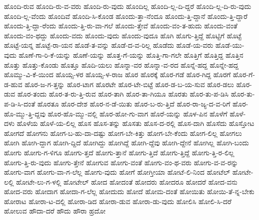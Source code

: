 {ಹೊಂದಿ-ರುವ
ಹೊಂದಿ-ರು-ವ-ವರು
ಹೊಂದಿ-ರು-ವುದು
ಹೊಂದಿಲ್ಲ
ಹೊಂದಿ-ಲ್ಲ-ದಿ-ದ್ದರೆ
ಹೊಂದಿ-ಲ್ಲ-ದಿ-ರು-ವುದು
ಹೊಂದಿ-ಲ್ಲ-ವೆಂದು
ಹೊಂದಿವೆ
ಹೊಂದಿ-ಸಿ-ಕೊಂಡ
ಹೊಂದು-ತ್ತಾ-ನೆಂದೂ
ಹೊಂದು-ತ್ತಿ-ದ್ದಾನೆ
ಹೊಂದು-ತ್ತಿ-ದ್ದಾರೆ
ಹೊಂದು-ತ್ತಿ-ದ್ದಾ-ರೆಂದು
ಹೊಂದು-ತ್ತಿ-ರು-ವಾ-ಗಲೆ
ಹೊಂದು-ತ್ತೇವೆ
ಹೊಂದು-ವಂ-ತ-ಹುದು
ಹೊಂದು-ವಂತೆ
ಹೊಂದು-ವಂ-ಥದ್ದು
ಹೊಂದು-ವದು
ಹೊಂದು-ವುದು
ಹೊಂದು-ವುದೂ
ಹೊಗಿ
ಹೊಗು-ತ್ತಿದ್ದೆ
ಹೊಟ್ಟಿಗೆ
ಹೊಟ್ಟೆ
ಹೊಟ್ಟೆ-ಯನ್ನ
ಹೊಟ್ಟೆ-ರಾ-ಯನ
ಹೊಡೆ-ತ-ವನ್ನು
ಹೊಡೆ-ದ-ವ-ರಿಲ್ಲ
ಹೊಡೆದು
ಹೊಡೆ-ಯ-ವರು
ಹೊಡೆ-ಯು-ವುದು
ಹೊಣೆ-ಗಾ-ರಿ-ಕೆ-ಯನ್ನು
ಹೊಣೆ-ಯನ್ನು
ಹೊತ್ತ-ಗೆ-ಯನ್ನು
ಹೊತ್ತಿ-ಗಾ-ಗಲೇ
ಹೊತ್ತಿಗೆ
ಹೊತ್ತಿದ್ದ
ಹೊತ್ತಿನ
ಹೊತ್ತು
ಹೊತ್ತು-ಕೊಂಡು
ಹೊತ್ತೂ
ಹೊದಿ-ಯಲು
ಹೊನ್ನಾ-ವರ
ಹೊನ್ನಾ-ವ-ರದ
ಹೊನ್ನೆ-ಹದ್ದ
ಹೊನ್ನೇ-ಹದ್ದ
ಹೊಮ್ಮು-ವಿ-ಕೆ-ಯಿಂದ
ಹೊಯ್ಸ-ಳರ
ಹೊಯ್ಸ-ಳ-ರಾಜ
ಹೊರ
ಹೊರಕ್ಕೆ
ಹೊರ-ಗಡೆ
ಹೊರ-ಗಿದ್ದ
ಹೊರಗೆ
ಹೊರ-ಗೆ-ಡ-ಹುವ
ಹೊರ-ಜ-ಗ-ತ್ತನ್ನು
ಹೊರ-ಟಾಗ
ಹೊರಟೇ
ಹೊರ-ಟೇ-ಬಿಟ್ಟೆ
ಹೊರ-ಡ-ಬ-ಯ-ಸುವ
ಹೊರ-ಡಲು
ಹೊರ-ಡುವ
ಹೊರ-ತಂದು
ಹೊರ-ತ-ರು-ತ್ತಿ-ರುವ
ಹೊರ-ತಾಗಿ
ಹೊರ-ತಾ-ಗಿಯೂ
ಹೊರತು
ಹೊರ-ತು-ಪ-ಡಿಸಿ
ಹೊರ-ತು-ಪ-ಡಿ-ಸಿ-ದಂತೆ
ಹೊರತೂ
ಹೊರ-ದೇಶ
ಹೊರ-ನ-ಡೆ-ಯಿತು
ಹೊರ-ಬ-ರು-ತ್ತಿದೆ
ಹೊರ-ರಾ-ಜ್ಯ-ದ-ವ-ರಿಗೆ
ಹೊರ-ಹೊ-ಮ್ಮು-ತ್ತಿ-ದ್ದವು
ಹೊರ-ಹೊ-ಮ್ಮು-ವಲ್ಲಿ
ಹೊರ-ಹೋ-ಗು-ವಾಗ
ಹೊರೆ-ಯನ್ನು
ಹೊಳ-ಪಿನ
ಹೊಳೆಗೆ
ಹೊಳೆ-ದಳು
ಹೊಳೆಯ
ಹೊಳೆ-ಯ-ಲಿಲ್ಲ
ಹೊಸ
ಹೊಸ-ತನ್ನು
ಹೊಸತು
ಹೊಸ-ದ-ರಲ್ಲಿ
ಹೊಸ-ದಾಗಿ
ಹೊಸೆದು
ಹೊಸ್ತೋಟ
ಹೋಗದೆ
ಹೋಗನು
ಹೋಗ-ಬ-ಹು-ದಾ-ದಷ್ಟು
ಹೋಗ-ಬೇ-ಕಿತ್ತು
ಹೋಗ-ಬೇ-ಕೆಂದು
ಹೋಗ-ಲಿಲ್ಲ
ಹೋಗಲು
ಹೋಗಿ
ಹೋಗಿ-ದ್ದಾಗ
ಹೋಗಿ-ದ್ದಿದೆ
ಹೋಗಿದ್ದು
ಹೋಗಿದ್ದೆ
ಹೋಗಿ-ದ್ದೆವು
ಹೋಗಿ-ದ್ದೇನೆ
ಹೋಗಿಲ್ಲ
ಹೋಗಿ-ಬಂದು
ಹೋಗು
ಹೋಗು-ಗ-ಳಿಗೂ
ಹೋಗು-ತ್ತದೆ
ಹೋಗು-ತ್ತಾನೆ
ಹೋಗು-ತ್ತಿದೆ
ಹೋಗು-ತ್ತಿದ್ದೆ
ಹೋಗು-ತ್ತಿ-ರ-ಲಿಲ್ಲ
ಹೋಗು-ತ್ತಿ-ರು-ವುದು
ಹೋಗು-ತ್ತೇನೆ
ಹೋಗುವ
ಹೋಗು-ವಂತೆ
ಹೋಗು-ವಂ-ಥ-ವರು
ಹೋಗು-ವ-ವ-ರನ್ನು
ಹೋಗು-ವಾಗ
ಹೋಗು-ವಾ-ಗ-ಲೆಲ್ಲ
ಹೋಗು-ವುದು
ಹೋಗೆ
ಹೋಗ್ತೀಯಾ
ಹೋಟೆ-ಲಿ-ನಿಂದ
ಹೋಟೆಲ್
ಹೋಟೇ-ಲಲ್ಲಿ
ಹೋಟೇ-ಲು-ಗ-ಳಲ್ಲಿ
ಹೋಟೇಲ್
ಹೋದ
ಹೋದಂತೆ
ಹೋದರು
ಹೋದರೂ
ಹೋದರೆ
ಹೋದ-ವನು
ಹೋದ-ವರು
ಹೋದಾಗ
ಹೋದಾ-ಗ-ಲೆಲ್ಲ
ಹೋದುದು
ಹೋದೆ
ಹೋಮ-ದಂತೆ
ಹೋಯಿತು
ಹೋಯಿ-ತೆ-ನ್ನ-ಬೇಕು
ಹೋರಾಟ
ಹೋರಾ-ಟ-ದಲ್ಲಿ
ಹೋರಾ-ಡಿದ
ಹೋರಾ-ಡುವ
ಹೋರಾ-ಡು-ವುದು
ಹೋಲಿಸಿ
ಹೋಲಿ-ಸಿ-ದರೆ
ಹೋಲುವ
ಹೌದಾ-ದರೆ
ಹೌದು
ಹೌರಾ
ಹ್ರದೋ
}
